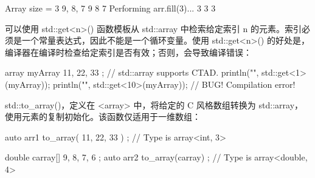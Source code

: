 \begin{shell}
Array size = 3
9, 8, 7
9 8 7
Performing arr.fill(3)...
3 3 3
\end{shell}

可以使用 std::get<n>() 函数模板从 std::array 中检索给定索引 n 的元素。索引必须是一个常量表达式，因此不能是一个循环变量。使用 std::get<n>() 的好处是，编译器在编译时检查给定索引是否有效；否则，会导致编译错误：

\begin{cpp}
array myArray { 11, 22, 33 }; // std::array supports CTAD.
println("{}", std::get<1>(myArray));
println("{}", std::get<10>(myArray)); // BUG! Compilation error!
\end{cpp}

std::to\_array()，定义在 <array> 中，将给定的 C 风格数组转换为 std::array，使用元素的复制初始化。该函数仅适用于一维数组：

\begin{cpp}
auto arr1 { to_array({ 11, 22, 33 }) }; // Type is array<int, 3>

double carray[] { 9, 8, 7, 6 };
auto arr2 { to_array(carray) }; // Type is array<double, 4>
\end{cpp}









